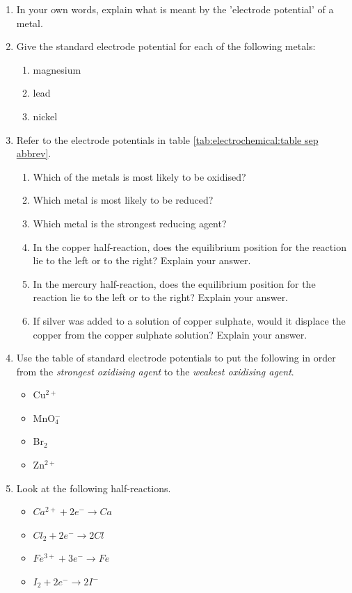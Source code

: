 {
\begin{enumerate}
\item{In your own words, explain what is meant by the 'electrode potential' of a metal.}
\item{Give the standard electrode potential for each of the following metals:
	\begin{enumerate}
	\item{magnesium}
	\item{lead}
	\item{nickel}
	\end{enumerate}}
\item{Refer to the electrode potentials in table \ref{tab:electrochemical:table sep abbrev}.
	\begin{enumerate}
	\item{Which of the metals is most likely to be oxidised?}
	\item{Which metal is most likely to be reduced?}
	\item{Which metal is the strongest reducing agent?}
	\item{In the copper half-reaction, does the equilibrium position for the reaction lie to the left or to the right? Explain your answer.}
	\item{In the mercury half-reaction, does the equilibrium position for the reaction lie to the left or to the right? Explain your answer.}
	\item{If silver was added to a solution of copper sulphate, would it displace the copper from the copper sulphate solution? Explain your answer.}
	\end{enumerate}}
\item{Use the table of standard electrode potentials to put the following in order from the \textit{strongest oxidising agent} to the \textit{weakest oxidising agent}.
	\begin{itemize}
	\item{Cu$^{2+}$}
	\item{MnO$_{4}^{-}$}
	\item{Br$_{2}$}
	\item{Zn$^{2+}$}
	\end{itemize}}
\item{Look at the following half-reactions.
	\begin{itemize}
	\item{\rm${Ca^{2+} + 2e^{-} \rightarrow Ca}$}
	\item{\rm${Cl_{2} + 2e^{-} \rightarrow 2Cl}$}
	\item{\rm${Fe^{3+} + 3e^{-} \rightarrow Fe}$}
	\item{\rm${I_{2} + 2e^{-} \rightarrow 2I^{-}}$}
 	\end{itemize}

}
\end{enumerate}}
